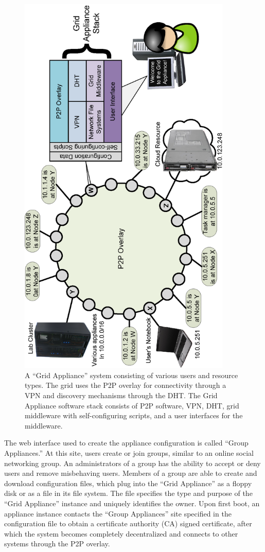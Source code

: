 \documentclass[conference]{IEEEtran}
\begin{document}
\begin{figure}[ht]
\centering
\includegraphics[width=4in,angle=-90]{figs/appliance_overlays.eps}
\caption{A ``Grid Appliance'' system consisting of various users and resource
types.  The grid uses the P2P overlay for connectivity through a VPN and
discovery mechanisms through the DHT.  The Grid Appliance software stack
consists of P2P software, VPN, DHT, grid middleware with self-configuring
scripts, and a user interfaces for the middleware.}
\label{fig:appliance}
\end{figure}

The web interface used to create the appliance configuration is called ``Group
Appliances.'' At this site, users create or join groups, similar to an online
social networking group.  An administrators of a group has the ability to
accept or deny users and remove misbehaving users.  Members of a group are able
to create and download configuration files, which plug into the ``Grid
Appliance'' as a floppy disk or as a file in its file system.  The file
specifies the type and purpose of the ``Grid Appliance'' instance and uniquely
identifies the owner.  Upon first boot, an appliance instance contacts the
``Group Appliances'' site specified in the configuration file to obtain a
certificate authority (CA) signed certificate, after which the system becomes
completely decentralized and connects to other systems through the P2P overlay.  
\end{document}
